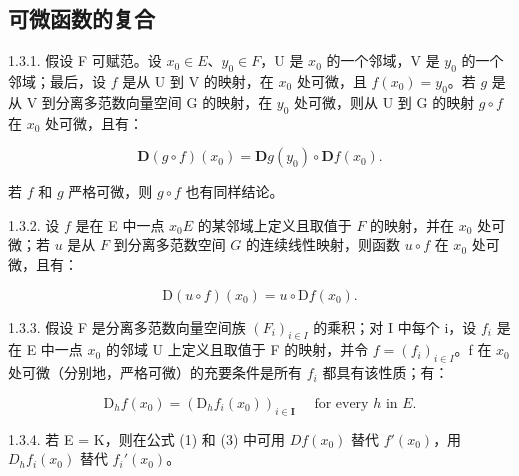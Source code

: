 \subsection{可微函数的复合}

1.3.1. 假设 F 可赋范。设 \(x_0 \in E\)、\(y_0 \in F\)，U 是 \(x_0\) 的一个邻域，V 是 \(y_0\) 的一个邻域；最后，设 \(f\) 是从 U 到 V 的映射，在 \(x_0\) 处可微，且 \(f(x_0) = y_0\)。若 \(g\) 是从 V 到分离多范数向量空间 G 的映射，在 \(y_0\) 处可微，则从 U 到 G 的映射 \(g \circ f\) 在 \(x_0\) 处可微，且有：

\[
\mathbf {D} (g \circ f) (x _ {0}) = \mathbf {D} g (y _ {0}) \circ \mathbf {D} f (x _ {0}).\tag{1}
\]

若 \(f\) 和 \(g\) 严格可微，则 \(g \circ f\) 也有同样结论。

1.3.2. 设 \(f\) 是在 E 中一点 \(x_0\)\(E\) 的某邻域上定义且取值于 \(F\) 的映射，并在 \(x_0\) 处可微；若 \(u\) 是从 \(F\) 到分离多范数空间 \(G\) 的连续线性映射，则函数 \(u \circ f\) 在 \(x_0\) 处可微，且有：

\[
\mathrm{D} (u \circ f) (x _ {0}) = u \circ \mathrm{D} f (x _ {0}).\tag{2}
\]

1.3.3. 假设 F 是分离多范数向量空间族 \((F_{i})_{i\in I}\) 的乘积；对 I 中每个 i，设 \(f_{i}\) 是在 E 中一点 \(x_{0}\) 的邻域 U 上定义且取值于 F 的映射，并令 \(f = (f_{i})_{i\in I}\)。f 在 \(x_{0}\) 处可微（分别地，严格可微）的充要条件是所有 \(f_{i}\) 都具有该性质；有：

\[
\mathrm{D} _ {h} f (x _ {0}) = (\mathrm{D} _ {h} f _ {i} (x _ {0})) _ {i \in \mathbf {I}} \quad \text { for   every } h \text { in } E.\tag{3}
\]

1.3.4. 若 E = K，则在公式 (1) 和 (3) 中可用 \(Df(x_{0})\) 替代 \(f'(x_{0})\)，用 \(D_{h}f_{i}(x_{0})\) 替代 \(f_{i}'(x_{0})\)。

